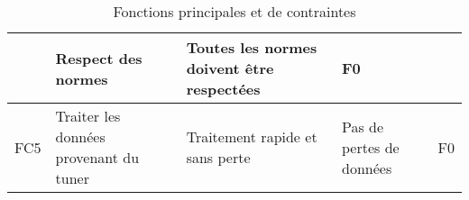 \begin{sidewaystable}[H]
\begin{tabularx}{\textwidth}{|X|X|X|X|X|}
  & Respect des normes 
  & Toutes les normes doivent être respectées 
  & F0 
  \\ \hline
  
FC5 
  & Traiter les données provenant du tuner  
  & Traitement rapide et sans perte 
  & Pas de pertes de données 
  & F0
  \\ \hline
  
\end{tabularx}
\endgroup{}
\caption{Fonctions principales et de contraintes}
\end{sidewaystable}